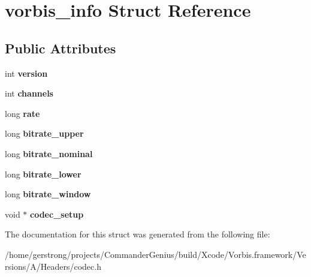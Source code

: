 \hypertarget{structvorbis__info}{
\section{vorbis\_\-info Struct Reference}
\label{structvorbis__info}
}
\subsection*{Public Attributes}
\begin{DoxyCompactItemize}
\item 
\hypertarget{structvorbis__info_a2d832259b1e3fbf4d1cd619ab5743612}{
int {\bfseries version}}
\label{structvorbis__info_a2d832259b1e3fbf4d1cd619ab5743612}

\item 
\hypertarget{structvorbis__info_a4240e042b91744b4fd810426f18252b4}{
int {\bfseries channels}}
\label{structvorbis__info_a4240e042b91744b4fd810426f18252b4}

\item 
\hypertarget{structvorbis__info_a01879ed23ecd9605cf6779ef2663a681}{
long {\bfseries rate}}
\label{structvorbis__info_a01879ed23ecd9605cf6779ef2663a681}

\item 
\hypertarget{structvorbis__info_a2d9d0e0725ae71c855ad39ce07bf7c88}{
long {\bfseries bitrate\_\-upper}}
\label{structvorbis__info_a2d9d0e0725ae71c855ad39ce07bf7c88}

\item 
\hypertarget{structvorbis__info_a71127d3e35c30fa110d7f321302a91b8}{
long {\bfseries bitrate\_\-nominal}}
\label{structvorbis__info_a71127d3e35c30fa110d7f321302a91b8}

\item 
\hypertarget{structvorbis__info_a216284288febd46a5547901cd5e6cd62}{
long {\bfseries bitrate\_\-lower}}
\label{structvorbis__info_a216284288febd46a5547901cd5e6cd62}

\item 
\hypertarget{structvorbis__info_aa511ecfc9eee8129df8f70e62ed08dc7}{
long {\bfseries bitrate\_\-window}}
\label{structvorbis__info_aa511ecfc9eee8129df8f70e62ed08dc7}

\item 
\hypertarget{structvorbis__info_a440988f081a417fd1586a4c3d44bc00c}{
void $\ast$ {\bfseries codec\_\-setup}}
\label{structvorbis__info_a440988f081a417fd1586a4c3d44bc00c}

\end{DoxyCompactItemize}


The documentation for this struct was generated from the following file:\begin{DoxyCompactItemize}
\item 
/home/gerstrong/projects/CommanderGenius/build/Xcode/Vorbis.framework/Versions/A/Headers/codec.h\end{DoxyCompactItemize}
